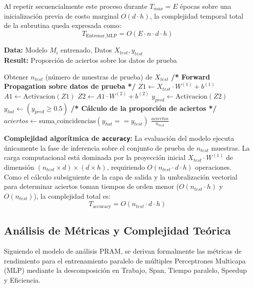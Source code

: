 \documentclass[11pt, a4paper]{article}
\begin{document}
Al repetir secuencialmente este proceso durante $T_{max} = E$ épocas sobre una inicialización previa de costo marginal $O(d \cdot h)$, la complejidad temporal total de la subrutina queda expresada como:
$$T_{\text{Entrenar\_MLP}} = O(E \cdot n \cdot d \cdot h)$$

\begin{algorithm}[H]
\caption{Evaluación del modelo (accuracy)}
\textbf{Data:} Modelo $M_i$ entrenado, Datos $X_{test}, y_{test}$\\
\textbf{Result:} Proporción de aciertos sobre los datos de prueba
\begin{algorithmic}[1]
    \State Obtener $n_{test}$ (número de muestras de prueba) de $X_{test}$
    \State \textbf{/* Forward Propagation sobre datos de prueba */}
    \State $Z1 \gets X_{test} \cdot W^{(1)} + b^{(1)}$
    \State $A1 \gets \text{Activacion}(Z1)$ 
    \State $Z2 \gets A1 \cdot W^{(2)} + b^{(2)}$ 
    \State $y_{pred} \gets \text{Activacion}(Z2)$
    \Statex
    \State $y_{hat} \gets (y_{pred} \ge 0.5)$
    \State \textbf{/* Cálculo de la proporción de aciertos */}
    \State $aciertos \gets \text{suma\_coincidencias}(y_{hat} == y_{test})$
    \State \Return $\frac{aciertos}{n_{test}}$
\end{algorithmic}
\end{algorithm}

\textbf{Complejidad algorítmica de \texttt{accuracy}:}
La evaluación del modelo ejecuta únicamente la fase de inferencia sobre el conjunto de prueba de $n_{test}$ muestras. La carga computacional está dominada por la proyección inicial $X_{test} \cdot W^{(1)}$ de dimensión $(n_{test} \times d) \times (d \times h)$, requiriendo $O(n_{test} \cdot d \cdot h)$ operaciones. Como el cálculo subsiguiente de la capa de salida y la umbralización vectorial para determinar aciertos toman tiempos de orden menor ($O(n_{test} \cdot h)$ y $O(n_{test})$), la complejidad total es:
$$T_{\text{accuracy}} = O(n_{test} \cdot d \cdot h)$$


\subsection{Análisis de Métricas y Complejidad Teórica}

Siguiendo el modelo de análisis PRAM, se derivan formalmente las métricas de rendimiento para el entrenamiento paralelo de múltiples Perceptrones Multicapa (MLP) mediante la descomposición en Trabajo, Span, Tiempo paralelo, Speedup y Eficiencia.
\end{document}
